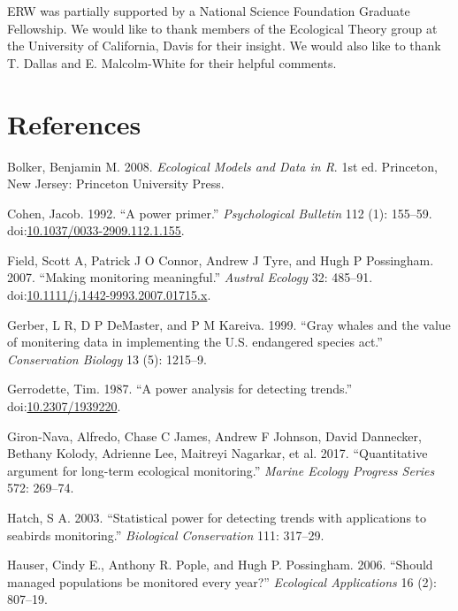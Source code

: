\documentclass[12pt,]{article}
\begin{document}
ERW was partially supported by a National Science Foundation Graduate
Fellowship. We would like to thank members of the Ecological Theory
group at the University of California, Davis for their insight. We would
also like to thank T. Dallas and E. Malcolm-White for their helpful
comments.

\section{References}\label{references}

\hypertarget{refs}{}
\hypertarget{ref-Bolker2008}{}
Bolker, Benjamin M. 2008. \emph{Ecological Models and Data in R}. 1st
ed. Princeton, New Jersey: Princeton University Press.

\hypertarget{ref-Cohen1992}{}
Cohen, Jacob. 1992. ``A power primer.'' \emph{Psychological Bulletin}
112 (1): 155--59.
doi:\href{https://doi.org/10.1037/0033-2909.112.1.155}{10.1037/0033-2909.112.1.155}.

\hypertarget{ref-Field2007}{}
Field, Scott A, Patrick J O Connor, Andrew J Tyre, and Hugh P
Possingham. 2007. ``Making monitoring meaningful.'' \emph{Austral
Ecology} 32: 485--91.
doi:\href{https://doi.org/10.1111/j.1442-9993.2007.01715.x}{10.1111/j.1442-9993.2007.01715.x}.

\hypertarget{ref-Gerber1999}{}
Gerber, L R, D P DeMaster, and P M Kareiva. 1999. ``Gray whales and the
value of monitering data in implementing the U.S. endangered species
act.'' \emph{Conservation Biology} 13 (5): 1215--9.

\hypertarget{ref-Gerrodette1987}{}
Gerrodette, Tim. 1987. ``A power analysis for detecting trends.''
doi:\href{https://doi.org/10.2307/1939220}{10.2307/1939220}.

\hypertarget{ref-Giron-Nava2017}{}
Giron-Nava, Alfredo, Chase C James, Andrew F Johnson, David Dannecker,
Bethany Kolody, Adrienne Lee, Maitreyi Nagarkar, et al. 2017.
``Quantitative argument for long-term ecological monitoring.''
\emph{Marine Ecology Progress Series} 572: 269--74.

\hypertarget{ref-Hatch2003}{}
Hatch, S A. 2003. ``Statistical power for detecting trends with
applications to seabirds monitoring.'' \emph{Biological Conservation}
111: 317--29.

\hypertarget{ref-Hauser2006}{}
Hauser, Cindy E., Anthony R. Pople, and Hugh P. Possingham. 2006.
``Should managed populations be monitored every year?'' \emph{Ecological
Applications} 16 (2): 807--19.
\end{document}
